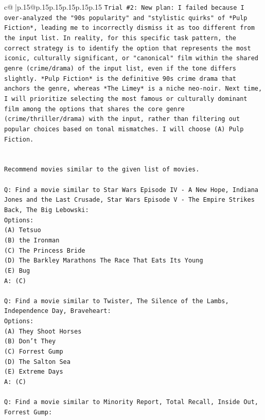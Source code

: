 \documentclass{article}
\begin{document}
{\begin{supertabular}{c@{$\;$}|p{.15\linewidth}@{}p{.15\linewidth}p{.15\linewidth}p{.15\linewidth}p{.15\linewidth}p{.15\linewidth}}
{{{\texttt{Trial \#2: New plan: I failed because I over{-}analyzed the "90s popularity" and "stylistic quirks" of *Pulp Fiction*, leading me to incorrectly dismiss it as too different from the input list. In reality, for this specific task pattern, the correct strategy is to identify the option that represents the most iconic, culturally significant, or "canonical" film within the shared genre (crime/drama) of the input list, even if the tone differs slightly. *Pulp Fiction* is the definitive 90s crime drama that anchors the genre, whereas *The Limey* is a niche neo{-}noir. Next time, I will prioritize selecting the most famous or culturally dominant film among the options that shares the core genre (crime/thriller/drama) with the input, rather than filtering out popular choices based on tonal mismatches. I will choose (A) Pulp Fiction.} \\
\\ 
\\ 
\texttt{Recommend movies similar to the given list of movies.} \\
\\ 
\texttt{Q: Find a movie similar to Star Wars Episode IV {-} A New Hope, Indiana Jones and the Last Crusade, Star Wars Episode V {-} The Empire Strikes Back, The Big Lebowski:} \\
\texttt{Options:} \\
\texttt{(A) Tetsuo} \\
\texttt{(B) the Ironman} \\
\texttt{(C) The Princess Bride} \\
\texttt{(D) The Barkley Marathons The Race That Eats Its Young} \\
\texttt{(E) Bug} \\
\texttt{A: (C)} \\
\\ 
\texttt{Q: Find a movie similar to Twister, The Silence of the Lambs, Independence Day, Braveheart:} \\
\texttt{Options:} \\
\texttt{(A) They Shoot Horses} \\
\texttt{(B) Don't They} \\
\texttt{(C) Forrest Gump} \\
\texttt{(D) The Salton Sea} \\
\texttt{(E) Extreme Days} \\
\texttt{A: (C)} \\
\\ 
\texttt{Q: Find a movie similar to Minority Report, Total Recall, Inside Out, Forrest Gump:} \\
}}}
\end{supertabular}}
\end{document}
